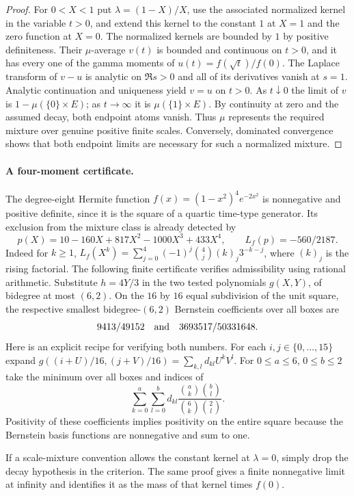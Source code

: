 \documentclass[11pt,a4paper]{article}
\numberwithin{equation}{section}
\begin{document}
\begin{proof}
For $0<X<1$ put $\lambda=(1-X)/X$, use the associated normalized
kernel in the variable $t>0$, and extend this kernel to the constant
$1$ at $X=1$ and the zero function at $X=0$. The normalized kernels
are bounded by $1$ by positive definiteness. Their $\mu$-average $v(t)$
is bounded and continuous on $t>0$, and it has every one of the
gamma moments of $u(t)=f(\sqrt t)/f(0)$. The Laplace transform of
$v-u$ is analytic on $\Re s>0$ and all of its derivatives vanish at
$s=1$. Analytic continuation and uniqueness yield $v=u$ on $t>0$.
As $t\downarrow0$ the limit of $v$ is $1-\mu(\{0\}\times E)$;
as $t\to\infty$ it is $\mu(\{1\}\times E)$. By continuity at zero
and the assumed decay, both endpoint atoms vanish. Thus $\mu$ represents
the required mixture over genuine positive finite scales. Conversely,
dominated convergence shows that both endpoint limits are necessary for
such a normalized mixture.
\end{proof}

\paragraph{A four-moment certificate.}
The degree-eight Hermite function $f(x)=(1-x^2)^4e^{-2x^2}$ is
nonnegative and positive definite, since it is the square of a quartic
time-type generator. Its exclusion from the mixture class is already
detected by
\[
 p(X)=10-160X+817X^2-1000X^3+433X^4,\qquad L_f(p)=-560/2187 .
\]
Indeed for $k\ge1$,
$L_f(X^k)=\sum_{j=0}^4(-1)^j\binom4j(k)_j3^{-k-j}$,
where $(k)_j$ is the rising factorial. The following finite certificate
verifies admissibility using rational arithmetic. Substitute $h=4Y/3$ in
the two tested polynomials $g(X,Y)$, of bidegree at most $(6,2)$.
On the $16$ by $16$ equal subdivision of the unit square, the respective
smallest bidegree-$(6,2)$ Bernstein coefficients over all boxes are
\[
 9413/49152\quad\hbox{and}\quad3693517/50331648.
\]
Here is an explicit recipe for verifying both numbers. For each
$i,j\in\{0,\ldots,15\}$ expand
$g((i+U)/16,(j+V)/16)=\sum_{k,l}d_{kl}U^kV^l$. For
$0\le a\le6$, $0\le b\le2$ take the minimum over all boxes and indices
of
\[
 \sum_{k=0}^a\sum_{l=0}^b d_{kl}
 \frac{\binom ak\binom bl}{\binom6k\binom2l}.
\]
Positivity of these coefficients implies positivity on the entire square
because the Bernstein basis functions are nonnegative and sum to one.

If a scale-mixture convention allows the constant kernel at
$\lambda=0$, simply drop the decay hypothesis in the criterion.
The same proof gives a finite nonnegative limit at infinity and identifies
it as the mass of that kernel times $f(0)$.
\end{document}
